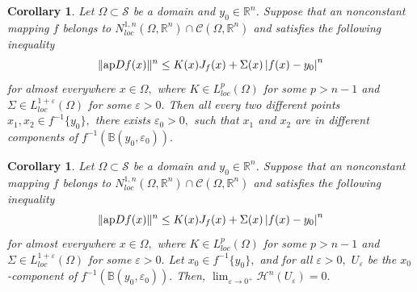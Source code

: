 \documentclass[11pt,twoside]{article}
\newtheorem{cor}[thm]{Corollary}
\theoremstyle{definition}
\theoremstyle{remark}
\newcommand{\abs}[1]{\left|#1\right|}
\begin{document}
\begin{cor}\label{sjslx}
Let $\Omega\subset\mathcal{S}$ be a domain and $y_{0}\in\mathbb{R}^{n}$. Suppose that an nonconstant mapping  $f$ belongs to  $N_{loc}^{1,n}(\Omega,\mathbb{R}^{n})\cap \mathcal{C}(\Omega,\mathbb{R}^{n})$ and satisfies the following inequality
\begin{equation}
\| {\rm ap}Df(x)\|^{n}\leq K(x)J_{f}(x)+\Sigma(x)\abs{f(x)-y_{0}}^{n}
\end{equation}
for almost everywhere $x\in\Omega,$ where $K\in L_{loc}^{p}(\Omega)$ for some $p>n-1$ and $\Sigma\in L_{loc}^{1+\varepsilon}(\Omega)$ for some $\varepsilon>0.$   Then  all every two different points $x_{1},x_{2}\in f^{-1}\{y_{0}\},$ there exists $\varepsilon_{0}>0,$ such that $x_{1}$ and $x_{2}$ are in different components of $f^{-1}(\mathbb{B}(y_{0},\varepsilon_{0})).$
\end{cor}


\begin{cor}\label{sxijsxsx}
Let $\Omega\subset\mathcal{S}$ be a domain and $y_{0}\in\mathbb{R}^{n}$. Suppose that an nonconstant mapping  $f$ belongs to  $N_{loc}^{1,n}(\Omega,\mathbb{R}^{n})\cap \mathcal{C}(\Omega,\mathbb{R}^{n})$ and satisfies the following inequality
\begin{equation}
\| {\rm ap}Df(x)\|^{n}\leq K(x)J_{f}(x)+\Sigma(x)\abs{f(x)-y_{0}}^{n}
\end{equation}
for almost everywhere $x\in\Omega,$ where $K\in L_{loc}^{p}(\Omega)$ for some $p>n-1$ and $\Sigma\in L_{loc}^{1+\varepsilon}(\Omega)$ for some $\varepsilon>0.$ Let $x_{0}\in f^{-1}\{y_{0}\},$  and for all $\varepsilon>0,$ $U_{\varepsilon}$ be the $x_{0}$-component of $f^{-1}(\mathbb{B}(y_{0},\varepsilon_{0})).$ Then, $\lim_{\varepsilon\rightarrow0^{+}}\mathcal{H}^{n}(U_{\varepsilon})=0.$
\end{cor}
\end{document}
